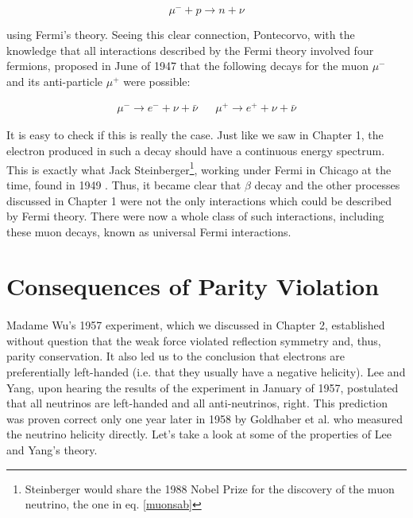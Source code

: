 \documentclass[a4paper,12pt]{book}
\begin{document}
\begin{equation}\label{muonsab}
 \mu^{-}+p \rightarrow n+\nu
\end{equation}

using Fermi's theory. Seeing this clear connection, Pontecorvo, with the knowledge that all interactions described by the Fermi theory involved four fermions, proposed in June of 1947 that the following decays for the muon $\mu^{-}$ and its anti-particle $\mu^{+}$ were possible\cite{pontecorvo}:

\begin{align}
 \mu^{-}\rightarrow e^{-}+\nu+\bar{\nu} & & \mu^{+}\rightarrow e^{+}+\nu+\bar{\nu}
\end{align}

It is easy to check if this is really the case. Just like we saw in Chapter 1, the electron produced in such a decay should have a continuous energy spectrum. This is exactly what Jack Steinberger\footnote{Steinberger would share the 1988 Nobel Prize for the discovery of the muon neutrino, the one in eq. \ref{muonsab}}, working under Fermi in Chicago at the time, found in 1949 \cite{steinberger}. Thus, it became clear that $\beta$ decay and the other processes discussed in Chapter 1 were not the only interactions which could be described by Fermi theory. There were now a whole class of such interactions, including these muon decays, known as universal Fermi interactions.


\section{Consequences of Parity Violation}

\paragraph{}Madame Wu's 1957 experiment, which we discussed in Chapter 2, established without question that the weak force violated reflection symmetry and, thus, parity conservation. It also led us to the conclusion that electrons are preferentially left-handed (i.e. that they usually have a negative helicity). Lee and Yang, upon hearing the results of the experiment in January of 1957, postulated that all neutrinos are left-handed and all anti-neutrinos, right. This prediction was proven correct only one year later in 1958 by Goldhaber et al. \cite{goldhaber} who measured the neutrino helicity directly. Let's take a look at some of the properties of Lee and Yang's theory.
\end{document}
